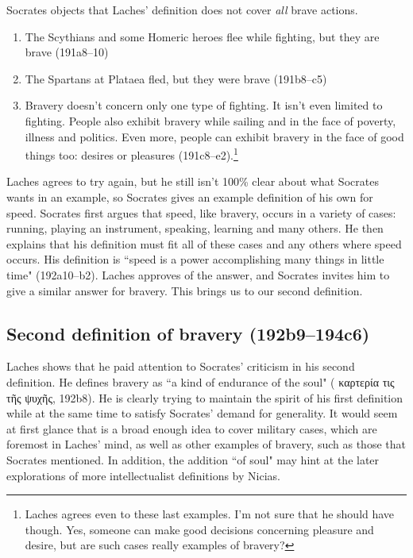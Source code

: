 \documentclass[11pt]{article}
\begin{document}
Socrates objects that Laches' definition does not cover \emph{all} brave
actions.

\begin{enumerate}

    \item The Scythians and some Homeric heroes flee while fighting, but they
        are brave (191a8--10)

    \item The Spartans at Plataea fled, but they were brave (191b8--c5)

    \item Bravery doesn't concern only one type of fighting.  It isn't even
        limited to fighting.  People also exhibit bravery while sailing and in
        the face of poverty, illness and politics.  Even more, people can
        exhibit bravery in the face of good things too: desires or pleasures
        (191c8--e2).\footnote{Laches agrees even to these last examples.  I'm
        not sure that he should have though.  Yes, someone can make good
        decisions concerning pleasure and desire, but are such cases really
        examples of bravery?}

\end{enumerate}

Laches agrees to try again, but he still isn't 100\% clear about what Socrates
wants in an example, so Socrates gives an example definition of his own for
speed.  Socrates first argues that speed, like bravery, occurs in a variety of
cases: running, playing an instrument, speaking, learning and many others.  He
then explains that his definition must fit all of these cases and any others
where speed occurs.  His definition is ``speed is a power accomplishing many
things in little time" (192a10--b2).  Laches approves of the answer, and
Socrates invites him to give a similar answer for bravery.  This brings us to
our second definition.


\subsection{Second definition of bravery (192b9--194c6)}

Laches shows that he paid attention to Socrates' criticism in his second
definition.  He defines bravery as ``a kind of endurance of the soul" ({\g
καρτερία τις τῆς ψυχῆς}, 192b8).  He is clearly trying to maintain the spirit
of his first definition while at the same time to satisfy Socrates' demand for
generality.  It would seem at first glance that  is a broad
enough idea to cover military cases, which are foremost in Laches' mind, as
well as other examples of bravery, such as those that Socrates mentioned.  In
addition, the addition ``of soul" may hint at the later explorations of more
intellectualist definitions by Nicias.
\end{document}
